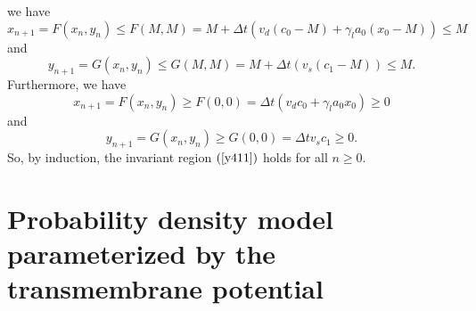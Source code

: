 we have%
\[
x_{n+1}=F\left(  x_{n},y_{n}\right)  \leqslant F(M,M)=M+\Delta t\left(
v_{d}\left(  c_{0}-M\right)  +\gamma_{l}a_{0}(x_{0}-M)\right)  \leqslant M
\]
and%
\[
y_{n+1}=G\left(  x_{n},y_{n}\right)  \leqslant G(M,M)=M+\Delta t\left(
v_{s}\left(  c_{1}-M\right)  \right)  \leqslant M.
\]
Furthermore, we have%
\[
x_{n+1}=F\left(  x_{n},y_{n}\right)  \geqslant F(0,0)=\Delta t\left(
v_{d}c_{0}+\gamma_{l}a_{0}x_{0}\right)  \geqslant0
\]
and%
\[
y_{n+1}=G\left(  x_{n},y_{n}\right)  \geqslant G(0,0)=\Delta tv_{s}%
c_{1}\geqslant0.
\]
So, by induction, the invariant region $\left(  \ref{y411}\right)$ holds for
all $n\geqslant0.$


\section[Probability density model parameterized by V]{Probability density model parameterized by the transmembrane potential}


